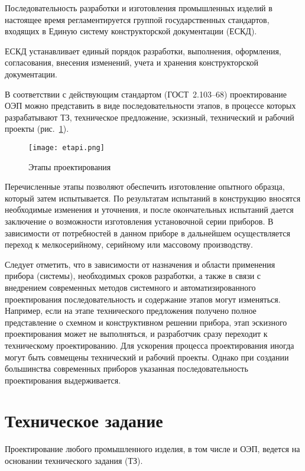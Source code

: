 Последовательность разработки и изготовления промышленных изделий в настоящее время регламентируется группой государственных стандартов, входящих в Единую систему конструкторской документации (ЕСКД).

ЕСКД устанавливает единый порядок разработки, выполнения, оформления, согласования, внесения изменений, учета и хранения конструкторской документации.

В соответствии с действующим стандартом (ГОСТ~2.103–68) проектирование ОЭП можно представить в виде последовательности этапов, в процессе которых разрабатывают ТЗ, техническое предложение, эскизный, технический и рабочий проекты (рис.~\ref{pic:etapi}).

\begin{figure}[h!]
	\begin{center}
		\texttt{[image: etapi.png]}
		\caption{Этапы проектирования}
		\label{pic:etapi}
	\end{center}
\end{figure}

Перечисленные этапы позволяют обеспечить изготовление опытного образца, который затем испытывается. 
По результатам испытаний в конструкцию вносятся необходимые изменения и уточнения, и после окончательных испытаний дается заключение о возможности изготовления установочной серии приборов. 
В зависимости от потребностей в данном приборе в дальнейшем осуществляется переход к мелкосерийному, серийному или массовому производству.

Следует отметить, что в зависимости от назначения и области применения прибора (системы), необходимых сроков разработки, а также в связи с внедрением современных методов системного и автоматизированного проектирования последовательность и содержание этапов могут изменяться. 
Например, если на этапе технического предложения получено полное представление о схемном и конструктивном решении прибора, этап эскизного проектирования может не выполняться, и разработчик сразу переходит к техническому проектированию. 
Для ускорения процесса проектирования иногда могут быть совмещены технический и рабочий проекты. 
Однако при создании большинства современных приборов указанная последовательность проектирования выдерживается.

\section{Техническое задание}
Проектирование любого промышленного изделия, в том числе и ОЭП, ведется на основании технического задания (ТЗ).

